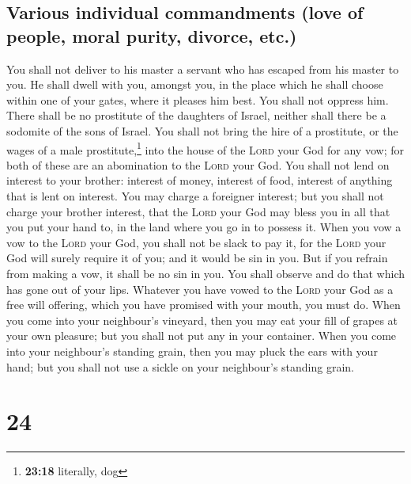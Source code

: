 \hypertarget{various-individual-commandments-love-of-people-moral-purity-divorce-etc.}{%
\subsection{Various individual commandments (love of people, moral
purity, divorce,
etc.)}\label{various-individual-commandments-love-of-people-moral-purity-divorce-etc.}}

 You shall not deliver to his master a servant who has
escaped from his master to you.  He shall dwell with you,
amongst you, in the place which he shall choose within one of your
gates, where it pleases him best. You shall not oppress him.
 There shall be no prostitute of the daughters of Israel,
neither shall there be a sodomite of the sons of Israel. 
You shall not bring the hire of a prostitute, or the wages of a male
prostitute,\footnote{\textbf{23:18} literally, dog} into the house of
the \textsc{Lord} your God for any vow; for both of these are an
abomination to the \textsc{Lord} your God.  You shall not
lend on interest to your brother: interest of money, interest of food,
interest of anything that is lent on interest.  You may
charge a foreigner interest; but you shall not charge your brother
interest, that the \textsc{Lord} your God may bless you in all that you
put your hand to, in the land where you go in to possess it.
 When you vow a vow to the \textsc{Lord} your God, you
shall not be slack to pay it, for the \textsc{Lord} your God will surely
require it of you; and it would be sin in you.  But if
you refrain from making a vow, it shall be no sin in you.
 You shall observe and do that which has gone out of your
lips. Whatever you have vowed to the \textsc{Lord} your God as a free
will offering, which you have promised with your mouth, you must do.
 When you come into your neighbour's vineyard, then you
may eat your fill of grapes at your own pleasure; but you shall not put
any in your container.  When you come into your
neighbour's standing grain, then you may pluck the ears with your hand;
but you shall not use a sickle on your neighbour's standing grain.

\hypertarget{section-23}{%
\section{24}\label{section-23}}

